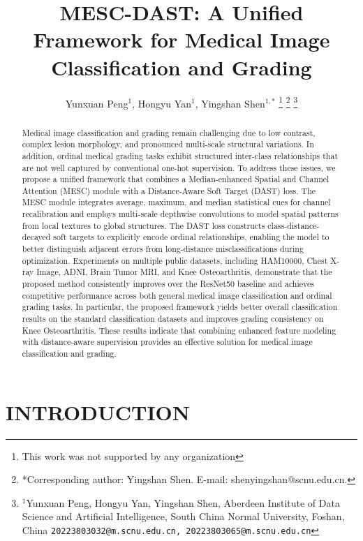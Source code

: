 \documentclass[letterpaper, 10 pt, conference]{ieeeconf}  %
\title{\LARGE \bf
MESC-DAST: A Unified Framework for Medical Image Classification and Grading
}
\author{Yunxuan Peng$^{1}$, Hongyu Yan$^{1}$, Yingshan Shen$^{1,*}$
    \thanks{This work was not supported by any organization}%
    \thanks{*Corresponding author: Yingshan Shen. E-mail: shenyingshan@scnu.edu.cn.}%
    \thanks{$^{1}$Yunxuan Peng, Hongyu Yan, Yingshan Shen, Aberdeen Institute of Data Science and Artificial Intelligence, South China Normal University, Foshan, China
        {\tt\small 20223803032@m.scnu.edu.cn, 20223803065@m.scnu.edu.cn}} %
}
\begin{document}
\maketitle
\thispagestyle{empty}
\pagestyle{empty}


\begin{abstract}

Medical image classification and grading remain challenging due to low contrast, complex lesion morphology, and pronounced multi-scale structural variations. In addition, ordinal medical grading tasks exhibit structured inter-class relationships that are not well captured by conventional one-hot supervision. To address these issues, we propose a unified framework that combines a Median-enhanced Spatial and Channel Attention (MESC) module with a Distance-Aware Soft Target (DAST) loss. The MESC module integrates average, maximum, and median statistical cues for channel recalibration and employs multi-scale depthwise convolutions to model spatial patterns from local textures to global structures. The DAST loss constructs class-distance-decayed soft targets to explicitly encode ordinal relationships, enabling the model to better distinguish adjacent errors from long-distance misclassifications during optimization. Experiments on multiple public datasets, including HAM10000, Chest X-ray Image, ADNI, Brain Tumor MRI, and Knee Osteoarthritis, demonstrate that the proposed method consistently improves over the ResNet50 baseline and achieves competitive performance across both general medical image classification and ordinal grading tasks. In particular, the proposed framework yields better overall classification results on the standard classification datasets and improves grading consistency on Knee Osteoarthritis. These results indicate that combining enhanced feature modeling with distance-aware supervision provides an effective solution for medical image classification and grading.

\end{abstract}


\section{INTRODUCTION}
\end{document}
